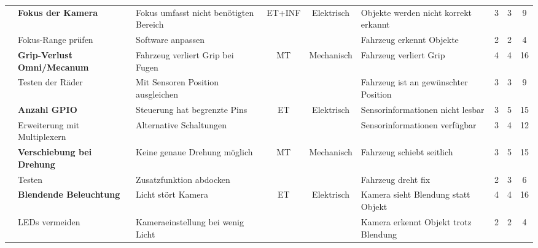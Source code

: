 \documentclass[../main.tex]{subfiles}
\begin{document}
\begin{landscape}
\begin{longtable}{|c|p{4.5cm}|p{5cm}|c|c|p{4.5cm}|c|c|c|}
\rowcolor{white} & \textbf{Fokus der Kamera} & Fokus umfasst nicht benötigten Bereich & ET+INF & Elektrisch & Objekte werden nicht korrekt erkannt & 3 & 3 & \cellcolor[HTML]{FFFF66}9 \\* \cline{2-3} \cline{6-9}
\rowcolor{white} \multirow{-2}{*}{R12} & Fokus-Range prüfen & Software anpassen & & & Fahrzeug erkennt Objekte & 2 & 2 & \cellcolor[HTML]{CCFF33}4 \\ \hline

\rowcolor[HTML]{F5F5F5} & \textbf{Grip-Verlust Omni/Mecanum} & Fahrzeug verliert Grip bei Fugen & MT & Mechanisch & Fahrzeug verliert Grip & 4 & 4 & \cellcolor[HTML]{FFC000}16 \\* \cline{2-3} \cline{6-9}
\rowcolor[HTML]{F5F5F5} \multirow{-2}{*}{R13} & Testen der Räder & Mit Sensoren Position ausgleichen & & & Fahrzeug ist an gewünschter Position & 3 & 3 &\cellcolor[HTML]{FFFF66} 9 \\ \hline

\rowcolor{white} & \textbf{Anzahl GPIO} & Steuerung hat begrenzte Pins & ET & Elektrisch & Sensorinformationen nicht lesbar & 3 & 5 & \cellcolor[HTML]{FFC000}15 \\* \cline{2-3} \cline{6-9}
\rowcolor{white} \multirow{-2}{*}{R14} & Erweiterung mit Multiplexern & Alternative Schaltungen & & & Sensorinformationen verfügbar & 3 & 4 & \cellcolor[HTML]{FFC000}12 \\ \hline

\rowcolor[HTML]{F5F5F5} & \textbf{Verschiebung bei Drehung} & Keine genaue Drehung möglich & MT & Mechanisch & Fahrzeug schiebt seitlich & 3 & 5 & \cellcolor[HTML]{FFC000}15 \\* \cline{2-3} \cline{6-9}
\rowcolor[HTML]{F5F5F5} \multirow{-2}{*}{R15} & Testen & Zusatzfunktion abdocken & & & Fahrzeug dreht fix & 2 & 3 & \cellcolor[HTML]{CCFF33}6 \\ \hline

\rowcolor{white} & \textbf{Blendende Beleuchtung} & Licht stört Kamera & ET & Elektrisch & Kamera sieht Blendung statt Objekt & 4 & 4 & \cellcolor[HTML]{FFC000}16 \\* \cline{2-3} \cline{6-9}
\rowcolor{white} \multirow{-2}{*}{R17} & LEDs vermeiden & Kameraeinstellung bei wenig Licht & & & Kamera erkennt Objekt trotz Blendung & 2 & 2 & \cellcolor[HTML]{CCFF33}4 \\ \hline

\end{longtable}
\normalsize    
\end{landscape}
\end{document}
